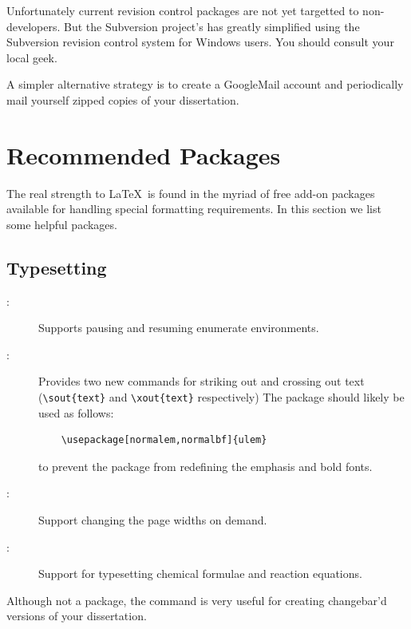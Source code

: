 Unfortunately current revision control packages are not yet targetted
to non-developers.  But the Subversion project's
has greatly simplified using the Subversion revision control system
for Windows users.  You should consult your local geek.

A simpler alternative strategy is to create a GoogleMail account
and periodically mail yourself zipped copies of your dissertation.

\section{Recommended Packages}

The real strength to \LaTeX\ is found in the myriad of free add-on
packages available for handling special formatting requirements.
In this section we list some helpful packages.

\subsection{Typesetting}

\begin{description}
\item[:]
    Supports pausing and resuming enumerate environments.

\item[:]
    Provides two new commands for striking out and crossing out text
    (\verb+\sout{text}+ and \verb+\xout{text}+ respectively)
    The package should likely
    be used as follows:
    \begin{verbatim}
    \usepackage[normalem,normalbf]{ulem}
    \end{verbatim}
    to prevent the package from redefining the emphasis and bold fonts.

\item[:]
    Support changing the page widths on demand.

\item[:] 
    Support for typesetting chemical formulae and reaction equations.

\end{description}

Although not a package, the
command is very useful for creating changebar'd versions of your
dissertation.


